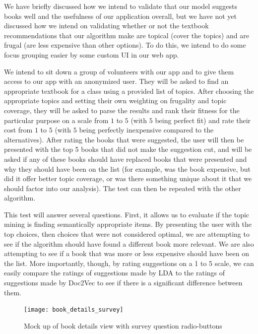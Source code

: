 We have briefly discussed how we intend to validate that our model suggests books well and the usefulness of our application overall, but we have not yet discussed how we intend on validating whether or not the textbook recommendations that our algorithm make are topical (cover the topics) and are frugal (are less expensive than other options).  
To do this, we intend to do some focus grouping easier by some custom UI in our web app.

We intend to sit down a group of volunteers with our app and to give them access to our app with an anonymized user.  
They will be asked to find an appropriate textbook for a class using a provided list of topics.  
After choosing the appropriate topics and setting their own weighting on frugality and topic coverage, they will be asked to parse the results and rank their fitness for the particular purpose on a scale from $1$ to $5$ (with $5$ being perfect fit) and rate their cost from $1$ to $5$ (with $5$ being perfectly inexpensive compared to the alternatives).  
After rating the books that were suggested, the user will then be presented with the top 5 books that did not make the suggestion cut, and will be asked if any of these books should have replaced books that were presented and why they should have been on the list (for example, was the book expensive, but did it offer better topic coverage, or was there something unique about it that we should factor into our analysis).  
The test can then be repeated with the other algorithm.

This test will answer several questions.  
First, it allows us to evaluate if the topic mining is finding semantically appropriate items.  
By presenting the user with the top choices, then choices that were not considered optimal, we are attempting to see if the algorithm should have found a different book more relevant.  
We are also attempting to see if a book that was more or less expensive should have been on the list.  
More importantly, though, by rating suggestions on a 1 to 5 scale, we can easily compare the ratings of suggestions made by LDA to the ratings of suggestions made by Doc2Vec to see if there is a significant difference between them.  

\begin{figure}[ht]
\label{eval_plan:mockup_survey}
\caption{Mock up of book details view with survey question radio-buttons}
\centering
\texttt{[image: book\_details\_survey]}
\end{figure}

